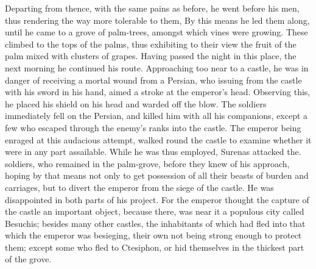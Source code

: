 Departing from thence, with the same pains as before, he went before his men, thus rendering the way more tolerable to them, By this means he led them along, until he came to a grove of palm-trees, amongst which vines were growing. These climbed to the tops of the palms, thus exhibiting to their view the fruit of the palm mixed with clusters of grapes. Having passed the night in this place, the next morning he continued his route. Approaching too near to a castle, he was in danger of receiving a mortal wound from a Persian, who issuing from the castle with his sword in his hand, aimed a stroke at the emperor's head. Observing this, he placed his shield on his head and warded off the blow. The soldiers immediately fell on the Persian, and killed him with all his companions, except a few who escaped through the enemy's ranks into the castle. The emperor being enraged at this audacious attempt, walked round the castle to examine whether it were in any part assailable. While he was thus employed, Surenas attacked the. soldiers, who remained in the palm-grove, before they knew of his approach, hoping by that means not only to get possession of all their beasts of burden and carriages, but to divert the emperor from the siege of the castle. He was disappointed in both parts of his project. For the emperor thought the capture of the castle an important object, because there, was near it a populous city called Besuchis;
besides many other castles, the inhabitants of which had fled into that which the emperor was besieging, their own not being strong enough to protect them; except some who fled to Ctesiphon, or hid themselves in the thickest part of the grove.

